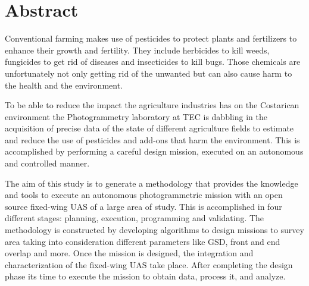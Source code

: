 \section{Abstract}
Conventional farming makes use of pesticides to protect plants and fertilizers to enhance their growth and fertility. They include herbicides to kill weeds, fungicides to get rid of diseases and insecticides to kill bugs. Those chemicals are unfortunately not only getting rid of the unwanted but can also cause harm to the health and the environment.

To be able to reduce the impact the agriculture industries has on the Costarican environment the Photogrammetry laboratory at TEC is dabbling in the acquisition of precise data of the state of different agriculture fields to estimate and reduce the use of pesticides and add-ons that harm the environment. This is accomplished by performing a careful design mission, executed on an autonomous and controlled manner.

The aim of this study is to generate a methodology that provides the knowledge and tools to execute an autonomous photogrammetric mission with an open source fixed-wing UAS of a large area of study. This is accomplished in four different stages: planning, execution, programming and validating. The methodology is constructed by developing algorithms to design missions to survey area taking into consideration different parameters like GSD, front and end overlap and more. Once the mission is designed, the integration and characterization of the fixed-wing UAS take place. After completing the design phase its time to execute the mission to obtain data,  process it, and analyze.